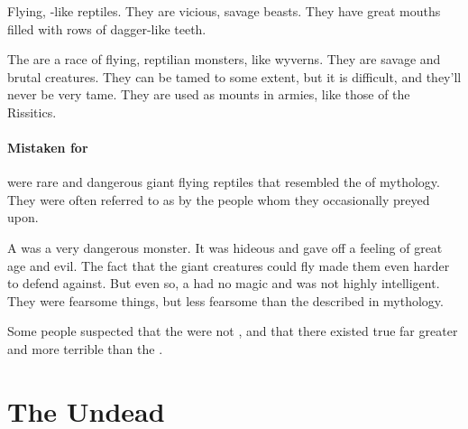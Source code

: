 \subsection{\Vreiiden}
\index{\vreiid}
Flying, \dragon-like reptiles. They are vicious, savage beasts. They have great mouths filled with rows of dagger-like teeth. 

The \vreiiden{} are a race of flying, reptilian monsters, like wyverns. They are savage and brutal creatures. They can be tamed to some extent, but it is difficult, and they'll never be very tame. They are used as mounts in  armies, like those of the Rissitics. 





\subsubsection{Mistaken for \dragons}
\Vreiid were rare and dangerous giant flying reptiles that resembled the \dragons of mythology. 
They were often referred to as \dragons by the people whom they occasionally preyed upon. 

A \vreiid was a very dangerous monster.
It was hideous and gave off a feeling of great age and evil. 
The fact that the giant creatures could fly made them even harder to defend against. 
But even so, a \vreiid had no magic and was not highly intelligent. 
They were fearsome things, but less fearsome than the \dragons described in mythology.

Some people suspected that the \vreiiden were not \dragons, and that there existed true \dragons far greater and more terrible than the \vreiiden. 

























\chapter{The Undead}















